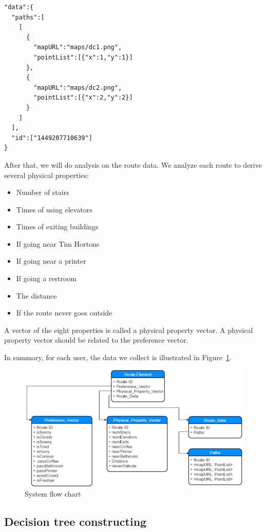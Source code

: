 \documentclass{sigchi}
\begin{document}
\begin{verbatim}
"data":{
  "paths":[
    [
      {
        "mapURL":"maps/dc1.png",
        "pointList":[{"x":1,"y":1}]
      },
      {
        "mapURL":"maps/dc2.png",
        "pointList":[{"x":2,"y":2}]
      }
    ]
  ],
  "id":["1449207710639"]
}
\end{verbatim}

After that, we will do analysis on the route data. We analyze each route to derive several physical properties:
\begin{itemize}
\item Number of stairs
\item Times of using elevators
\item Times of exiting buildings
\item If going near Tim Hortons
\item If going near a printer
\item If going a restroom
\item The distance
\item If the route never goes outside
\end{itemize}

A vector of the eight properties is called a physical property vector. A physical property vector should be related to the preference vector.


In summary, for each user, the data we collect is illustrated in Figure~\ref{fig:element-detail}.

\begin{figure}[!h]
\centering
\includegraphics[width=1.0\columnwidth]{pics/element-detail.png}
\caption{System flow chart}
\label{fig:element-detail}
\end{figure}

\subsection{Decision tree constructing}
\end{document}
